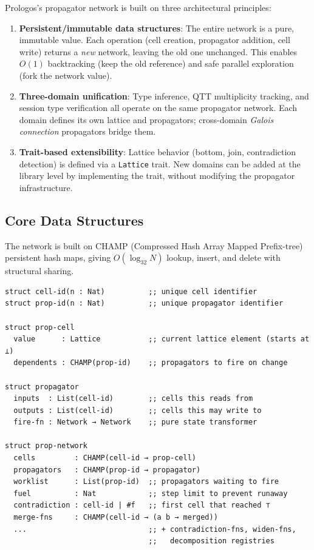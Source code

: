 \documentclass[11pt]{article}
\begin{document}
Prologos's propagator network is built on three architectural principles:

\begin{enumerate}
\item \textbf{Persistent/immutable data structures}: The entire network is a pure,
immutable value. Each operation (cell creation, propagator addition,
cell write) returns a \emph{new} network, leaving the old one unchanged.
This enables \(O(1)\) backtracking (keep the old reference) and safe
parallel exploration (fork the network value).

\item \textbf{Three-domain unification}: Type inference, QTT multiplicity
tracking, and session type verification all operate on the same
propagator network. Each domain defines its own lattice and
propagators; cross-domain \emph{Galois connection} propagators bridge them.

\item \textbf{Trait-based extensibility}: Lattice behavior (bottom, join,
contradiction detection) is defined via a \texttt{Lattice} trait.
New domains can be added at the library level by implementing
the trait, without modifying the propagator infrastructure.
\end{enumerate}
\subsection{Core Data Structures}
\label{sec:org91b37b5}

The network is built on CHAMP (Compressed Hash Array Mapped Prefix-tree)
persistent hash maps, giving \(O(\log_{32} N)\) lookup, insert, and delete
with structural sharing.

\begin{verbatim}
struct cell-id(n : Nat)          ;; unique cell identifier
struct prop-id(n : Nat)          ;; unique propagator identifier

struct prop-cell
  value      : Lattice           ;; current lattice element (starts at ⊥)
  dependents : CHAMP(prop-id)    ;; propagators to fire on change

struct propagator
  inputs  : List(cell-id)        ;; cells this reads from
  outputs : List(cell-id)        ;; cells this may write to
  fire-fn : Network → Network    ;; pure state transformer

struct prop-network
  cells         : CHAMP(cell-id → prop-cell)
  propagators   : CHAMP(prop-id → propagator)
  worklist      : List(prop-id)  ;; propagators waiting to fire
  fuel          : Nat            ;; step limit to prevent runaway
  contradiction : cell-id | #f   ;; first cell that reached ⊤
  merge-fns     : CHAMP(cell-id → (a b → merged))
  ...                            ;; + contradiction-fns, widen-fns,
                                 ;;   decomposition registries
\end{verbatim}
\end{document}
